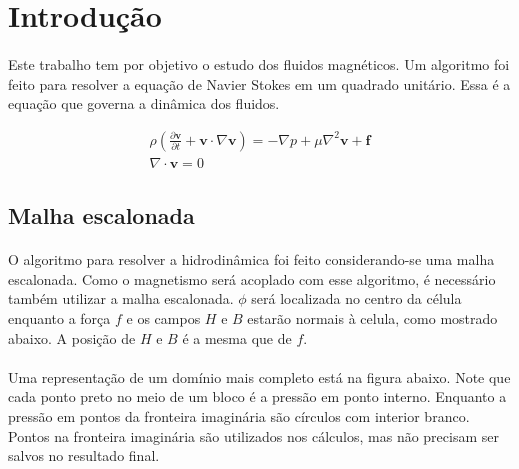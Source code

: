 \documentclass[introducao.tex]{subfiles}
\begin{document}
\section{Introdução}
\paragraph{} Este trabalho tem por objetivo o estudo dos fluidos magnéticos. Um algoritmo foi feito para resolver a equação de Navier Stokes em um quadrado unitário. Essa é a equação que governa a dinâmica dos fluidos.

\begin{eqnarray}
\rho\left( \frac{\partial {\textbf{v}}}{\partial t}+\textbf{v}\cdot\nabla \textbf{v} \right)=-\nabla p+\mu\nabla^2 \textbf{v} + \textbf{f}\label{navierstokes}\\
\nabla\cdot\textbf{v}=0
\end{eqnarray}


\subsection{Malha escalonada}
\paragraph{} O algoritmo para resolver a hidrodinâmica foi feito considerando-se uma malha escalonada. Como o magnetismo será acoplado com esse algoritmo, é necessário também utilizar a malha escalonada. $\phi$ será localizada no centro da célula enquanto a força $f$ e os campos $H$ e $B$ estarão normais à celula, como mostrado abaixo. A posição de $H$ e $B$ é a mesma que de $f$.

\begin{center}
\end{center}

\paragraph{} Uma representação de um domínio mais completo está na figura abaixo. Note que cada ponto preto no meio de um bloco é a pressão em ponto interno. Enquanto a pressão em pontos da fronteira imaginária são círculos com interior branco. Pontos na fronteira imaginária são utilizados nos cálculos, mas não precisam ser salvos no resultado final.
\end{document}
